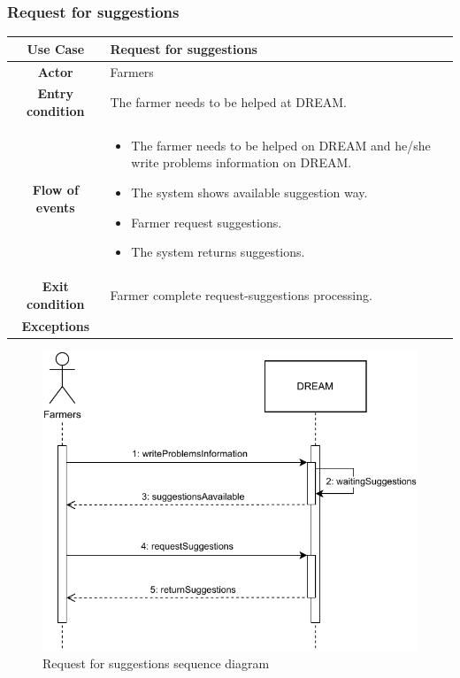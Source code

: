 \documentclass[../../main.tex]{subfiles}
\begin{document}
      \subsubsection{Request for suggestions}

      \begin{table}[H]
        \centering
          \begin{tabular}{c m{}}
          \hline
          \textbf{Use Case} & Request for suggestions \\ \hline
          \textbf{Actor} & Farmers\\ \hline
          \textbf{Entry condition} & The farmer needs to be helped at DREAM.\\  \hline
          \textbf{Flow of events} & \begin{itemize}
                                      \item The farmer needs to be helped on DREAM and he/she write problems information on DREAM.
                                      \item The system shows available suggestion way.
                                      \item Farmer request suggestions.
                                      \item The system returns suggestions.
                                    \end{itemize}\\ \hline
          \textbf{Exit condition} & Farmer complete request-suggestions processing. \\ \hline
          \textbf{Exceptions} &  \\ \hline
          \end{tabular}
      \end{table}

      \begin{figure}[H]
        \centering
        \includegraphics[width=\textwidth]{RASD/image/Sequence_Diagram_Farmers-requestForSuggestions.drawio.pdf}
        \caption{Request for suggestions sequence diagram}
      \end{figure}
\end{document}
